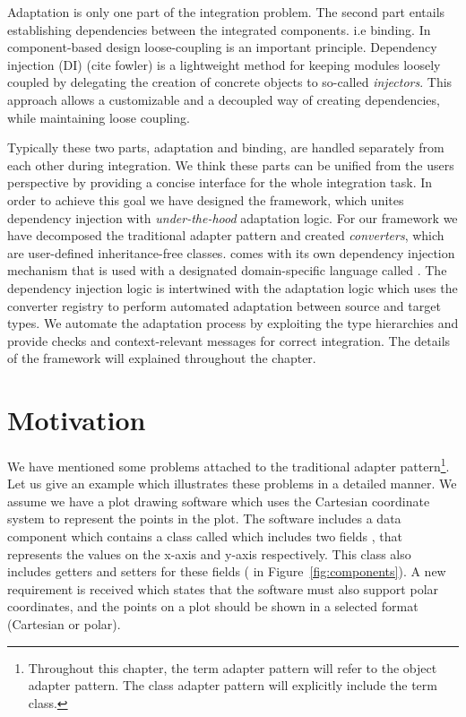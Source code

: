 Adaptation is only one part of the integration problem. 
The second part entails establishing dependencies between the integrated components. i.e binding. 
In component-based design loose-coupling is an important principle.  
Dependency injection (DI) (cite fowler) is a lightweight method for keeping modules loosely coupled by delegating the creation of concrete objects to so-called \emph{injectors}. 
This approach allows a customizable and a decoupled way of creating dependencies, while maintaining loose coupling.

Typically these two parts, adaptation and binding, are handled separately from each other during integration. 
We think these parts can be unified from the users perspective by providing a concise interface for the whole integration task.
In order to achieve this goal we have designed the \zamk framework, which unites dependency injection with \emph{under-the-hood} adaptation logic.
For our framework we have decomposed the traditional adapter pattern and created \emph{converters}, which are user-defined inheritance-free classes. 
\zamk comes with its own dependency injection mechanism that is used with a designated domain-specific language called \gluer. 
The dependency injection logic is intertwined with the adaptation logic which uses the converter registry to perform automated adaptation between source and target types. 
We automate the adaptation process by exploiting the type hierarchies and provide checks and context-relevant messages for correct integration. The details of the framework will explained throughout the chapter.

\section{Motivation}
\label{sec:adapter:motiv}

We have mentioned some problems attached to the traditional adapter pattern\footnote{Throughout this chapter, the term adapter pattern will refer to the object adapter pattern. The class adapter pattern will explicitly include the term class.}. Let us give an example which illustrates these problems in a detailed manner. 
We assume we have a plot drawing software which uses the Cartesian coordinate system to represent the points in the plot. 
The software includes a data component which contains a class called  which includes two fields , that represents the values on the x-axis and y-axis respectively. 
This class also includes getters and setters for these fields ( in Figure~\ref{fig:components}).
A new requirement is received which states that the software must also support polar coordinates, and the points on a plot should be shown in a selected format (Cartesian or polar). 

